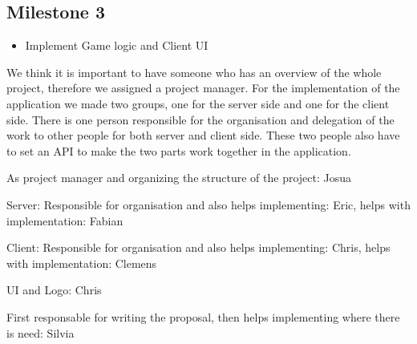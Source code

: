 \documentclass{report}
\begin{document}
\subsection{Milestone 3}
\begin{itemize}
	\item Implement Game logic and Client UI
\end{itemize}


We think it is important to have someone who has an overview of the whole project, therefore we assigned a project manager. For the implementation of the application we made two groups, one for the server side and one for the client side. There is one person responsible for the organisation and delegation of the work to other people for both server and client side. These two people also have to set an API to make the two parts work together in the application.

As project manager and organizing the structure of the project: Josua

Server: Responsible for organisation and also helps implementing: Eric, helps with implementation: Fabian

Client: Responsible for organisation and also helps implementing: Chris, helps with implementation: Clemens

UI and Logo: Chris

First responsable for writing the proposal, then helps implementing where there is need: Silvia




\end{document}
